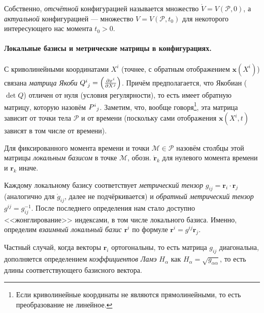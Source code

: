 Собственно, \emph{отсчётной} конфигурацией называется множество $ \mathring V =
V(\mathcal P,
0)$, а \emph{актуальной} конфигурацией --- множество $ V = V(\mathcal P, t_0) $ для
некоторого интересующего нас момента $ t_0 > 0 $.

\paragraph{Локальные базисы и метрические матрицы в конфигурациях.}\label{Локальные базисы и метрические матрицы в конфигурациях} С
криволинейными координатами $ X^i $ (точнее, с обратным отображением $ \mathbf
x(X^i) $) связана \emph{матрица Якоби} $
\tensor{Q}{^i_j} = \left( \frac{\partial x^i}{\partial X^j}\right)  $. Причём
предполагается, что Якобиан ($ \det Q $) отличен от нуля (условия регулярности),
то есть имеет обратную матрицу, которую назовём $ \tensor{P}{^i}{_j} $.
Заметим, что, вообще говоря\footnote{Если криволинейные координаты не являются
прямолинейными, то есть преобразование не линейное.}, эта матрица зависит от точки тела $ \mathcal
P$ и от времени (поскольку сами отображения $ \mathbf{x}(X^i, t) $ зависят в том
числе от времени).

Для фиксированного момента времени и точки $ \mathcal M \in \mathcal P $ назовём
столбцы этой матрицы \emph{локальным базисом} в точке $ \mathcal M $, обозн. $
\mathring{\mathbf{r}}_k $ для нулевого момента времени и $ \mathbf{r}_k $ иначе. 

Каждому локальному базису соответствует \emph{метрический тензор} $ g_{ij} =
\mathbf{r}_i \cdot \mathbf{r}_j $ (аналогично для $ \mathring g_{ij} $, далее не
подчёркивается) и
\emph{обратный метрический тензор} $ g^{ij} = g^{-1}_{ij} $. После последнего
определения нам стало доступно <<жонглирование>> индексами, в том числе
локального базиса. Именно, определим \emph{взаимный локальный базис $
\mathbf{r}^i $} по формуле $ \mathbf{r}^i = g^{ij}\mathbf{r}_j $.

Частный случай, когда векторы $ \mathbf{r}_i $ ортогональны, то есть матрица $
g_{ij} $ диагональна, дополняется определением \emph{коэффициентов Ламэ} $
H_\alpha $ как $ H_\alpha = \sqrt{g_{\alpha\alpha}} $, то есть длины
соответствующего базисного вектора.
